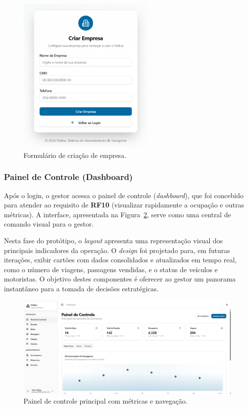 \begin{figure}[H]
  \centering
  \includegraphics[width=0.6\textwidth]{imagens/criacao-empresa.png}
  \caption{Formulário de criação de empresa.}
  \label{fig:criacao-empresa}
\end{figure}

\subsubsection{Painel de Controle (Dashboard)}
Após o login, o gestor acessa o painel de controle (\textit{dashboard}), que foi concebido para atender ao requisito de \textbf{RF10} (visualizar rapidamente a ocupação e outras métricas). A interface, apresentada na Figura~\ref{fig:dashboard}, serve como uma central de comando visual para o gestor.

Nesta fase do protótipo, o \textit{layout} apresenta uma representação visual dos principais indicadores da operação. O \textit{design} foi projetado para, em futuras iterações, exibir cartões com dados consolidados e atualizados em tempo real, como o número de viagens, passagens vendidas, e o status de veículos e motoristas. O objetivo destes componentes é oferecer ao gestor um panorama instantâneo para a tomada de decisões estratégicas.

\begin{figure}[H]
  \centering
  \includegraphics[width=1\textwidth]{imagens/dashboard.png}
  \caption{Painel de controle principal com métricas e navegação.}
  \label{fig:dashboard}
\end{figure}

